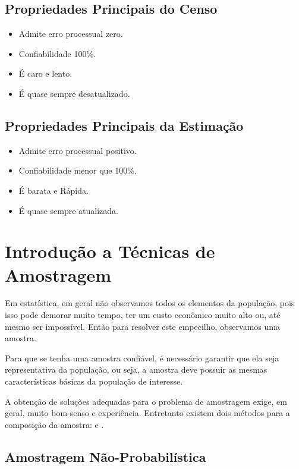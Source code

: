 \documentclass[11pt,fleqn]{book}
\numberwithin{mpicture}{chapter}
\numberwithin{mtable}{chapter}
\numberwithin{mframe}{chapter}
\begin{document}
\subsection{Propriedades Principais do Censo}

\begin{itemize}
	\item Admite erro processual zero.
	\item Confiabilidade 100\%.
	\item É caro e lento.
	\item É quase sempre desatualizado.
\end{itemize}

\subsection{Propriedades Principais da Estimação}

\begin{itemize}
	\item Admite erro processual positivo.
	\item Confiabilidade menor que 100\%.
	\item É barata e Rápida.
	\item É quase sempre atualizada.
\end{itemize}

\section{Introdução a Técnicas de Amostragem}

Em estatística, em geral não observamos todos os elementos da população, pois isso pode demorar muito tempo, ter um custo econômico muito alto ou, até mesmo ser impossível. Então para resolver este empecilho, observamos uma amostra.

Para que se tenha uma amostra confiável, é necessário garantir que ela seja representativa da população, ou seja, a amostra deve possuir as mesmas características básicas da população de interesse.

A obtenção de soluções adequadas para o problema de amostragem exige, em geral, muito bom-senso e experiência. Entretanto existem dois métodos para a composição da amostra:  e .

\subsection{Amostragem Não-Probabilística}
\end{document}
